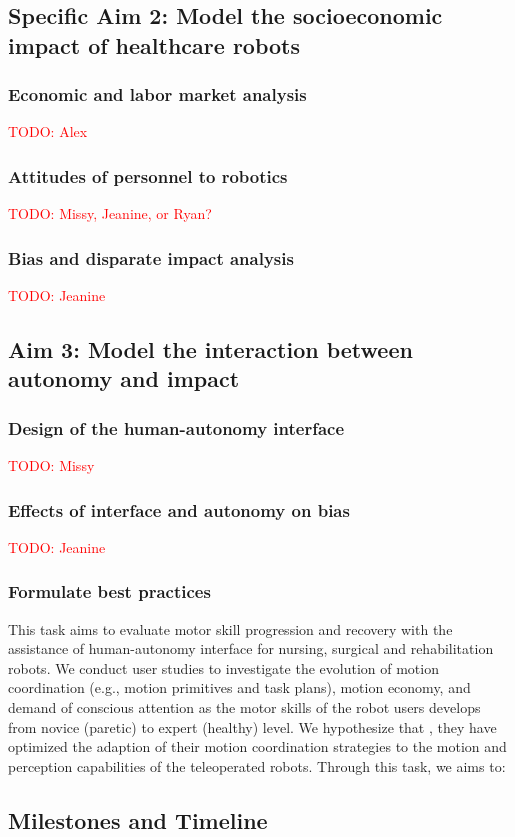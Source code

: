 \subsection{Specific Aim 2: Model the socioeconomic impact of healthcare robots}\label{sec:plan-task2}
\subsubsection{Economic and labor market analysis}
\textcolor{red}{TODO: Alex}

\subsubsection{Attitudes of personnel to robotics}
\textcolor{red}{TODO: Missy, Jeanine, or Ryan?}

\subsubsection{Bias and disparate impact analysis}
\textcolor{red}{TODO: Jeanine}

\subsection{Aim 3: Model the interaction between autonomy and impact}\label{sec:plan-task3}

\subsubsection{Design of the human-autonomy interface}
\textcolor{red}{TODO: Missy}

\subsubsection{Effects of interface and autonomy on bias}
\textcolor{red}{TODO: Jeanine}

\subsubsection{Formulate best practices}
This task aims to evaluate motor skill progression and recovery with the assistance of human-autonomy interface for nursing, surgical and rehabilitation robots. We conduct user studies to investigate the evolution of motion coordination (e.g., motion primitives and task plans), motion economy, and demand of conscious attention as the motor skills of the robot users develops from novice (paretic) to expert (healthy) level. We hypothesize that , they have optimized the adaption of their motion coordination strategies to the motion and perception capabilities of the teleoperated robots. Through this task, we aims to:





\subsection{Milestones and Timeline}

